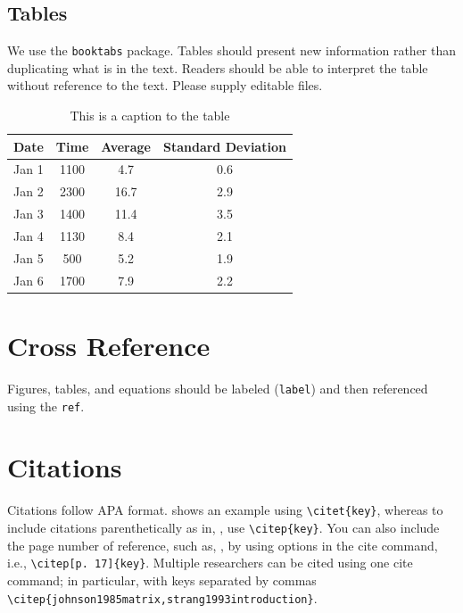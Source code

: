 \subsection{Tables}
We use the \texttt{booktabs} package.  
Tables should present new information rather than duplicating what is in the text. 
Readers should be able to interpret the table without reference to the text. Please supply editable files.


\begin{table}[ht!]
\begin{center}
\begin{tabular}{lccc} 
	\toprule
	Date & Time  &  Average   & Standard Deviation \\ 
	\midrule
	Jan 1  & 1100	& 4.7		& 0.6		\\
	Jan 2  & 2300	& 16.7	& 2.9		\\
	Jan 3  & 1400	& 11.4	& 3.5		\\
	Jan 4  & 1130	& 8.4		& 2.1		\\
	Jan 5  & 500	& 5.2		& 1.9		\\
	Jan 6  & 1700	& 7.9		& 2.2		\\
	\bottomrule 
\end{tabular} 
\caption{This is a caption to the table}
\label{tab:1} 
\end{center}
\end{table} %



\section{Cross Reference}
Figures, tables, and equations should be labeled (\texttt{label}) and then referenced using the \texttt{ref}. 


\section{Citations}
Citations follow APA format.  \citet{johnson1985matrix} shows an example using \verb!\citet{key}!, whereas to include citations parenthetically as in, \citep{johnson1985matrix}, use \verb!\citep{key}!.  
You can also include the page number of reference, such as, \citep[p. 17]{johnson1985matrix}, by using options in the cite command, i.e.,  \verb!\citep[p. 17]{key}!.  
Multiple researchers \citep{johnson1985matrix,strang1993introduction} can be cited using one cite command; in particular, with keys separated by commas  \verb!\citep{johnson1985matrix,strang1993introduction}!.



